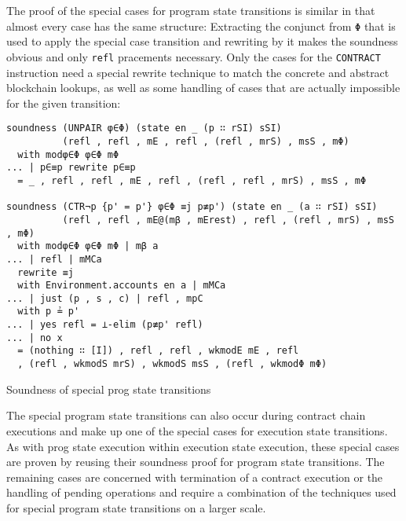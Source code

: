 The proof of the special cases for program state transitions is similar in that
almost every case has the same structure:
Extracting the conjunct from \verb/Φ/ that is used to apply the special case transition
and rewriting by it makes the soundness obvious and only \verb/refl/ pracements necessary.
Only the cases for the \verb/CONTRACT/ instruction need a special rewrite technique
to match the concrete and abstract blockchain lookups,
as well as some handling of cases that are actually impossible for the given transition:

\begin{listing}[!ht]
\begin{verbatim}
soundness (UNPAIR φ∈Φ) (state en _ (p ∷ rSI) sSI)
          (refl , refl , mE , refl , (refl , mrS) , msS , mΦ)
  with modφ∈Φ φ∈Φ mΦ
... | p∈≡p rewrite p∈≡p
  = _ , refl , refl , mE , refl , (refl , refl , mrS) , msS , mΦ

soundness (CTR¬p {p' = p'} φ∈Φ ≡j p≢p') (state en _ (a ∷ rSI) sSI)
          (refl , refl , mE@(mβ , mErest) , refl , (refl , mrS) , msS , mΦ)
  with modφ∈Φ φ∈Φ mΦ | mβ a
... | refl | mMCa
  rewrite ≡j
  with Environment.accounts en a | mMCa
... | just (p , s , c) | refl , mpC
  with p ≟ p'
... | yes refl = ⊥-elim (p≢p' refl)
... | no x
  = (nothing ∷ [I]) , refl , refl , wkmodE mE , refl
  , (refl , wkmodS mrS) , wkmodS msS , (refl , wkmodΦ mΦ)
\end{verbatim}
\caption{Soundness of special prog state transitions}
\label{prog-step-SC}
\end{listing}

The special program state transitions can also occur during contract chain executions
and make up one of the special cases for execution state transitions.
As with prog state execution within execution state execution,
these special cases are proven by reusing their soundness proof for program state transitions.
The remaining cases are concerned with termination of a contract execution
or the handling of pending operations and require a combination of the techniques used
for special program state transitions on a larger scale.


